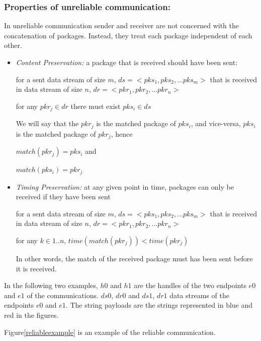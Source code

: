 \subsubsection{Properties of unreliable communication:}
In unreliable communication sender and receiver are not concerned with the concatenation of packages. Instead, they treat each package independent of each other.
\begin{itemize}
 \item \textit{ Content Preservation:} a package that is received should have been sent:

for a sent data stream of size $m$, $ds= <pks_1, pks_2, ... pks_m>$ that is received in data stream of size $n$, $dr = <pkr_1, pkr_2, ... pkr_n>$

for any $pkr_j \in dr$ there must exist $pks_i \in ds$

We will say that the $pkr_j$ is the matched package of $pks_i$, and vice-versa, $pks_i$ is the matched package of $pkr_j$, hence

$match(pkr_j) = pks_i$  and

$match(pks_i) = pkr_j$

 \item \textit{Timing Preservation:}  at any given point in time, packages can only be received if they have been sent

  for a sent data stream of size $m$, $ds= <pks_1, pks_2, ... pks_m>$ that is received in data stream of size $n$, $dr = <pkr_1, pkr_2, ... pkr_n>$

  for any $k \in {1..n}$, $time(match(pkr_j)) < time(pkr_j)$

In other words, the match of the received package must has been sent before it is received.

\end{itemize}



In the following two examples, $h0$ and $h1$ are the handles of the two endpoints $e0$ and $e1$ of the communications. $ds0$, $dr0$ and $ds1$, $dr1$ data streams of the endpoints $e0$ and $e1$. The string payloads are the strings represented in blue and red in the figures. 

Figure\ref{reliableexample} is an example of the reliable communication. 

